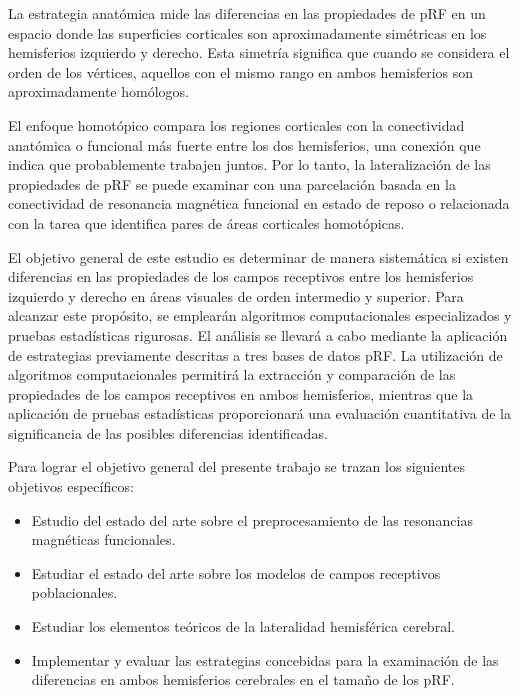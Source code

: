	La estrategia anatómica mide las diferencias en las propiedades de pRF en un espacio donde las superficies corticales son aproximadamente simétricas en los hemisferios izquierdo y derecho. Esta simetría significa que cuando se considera el orden de los vértices, aquellos con el mismo rango en ambos hemisferios son aproximadamente homólogos.
	
	El enfoque homotópico compara los regiones corticales con la conectividad anatómica o funcional más fuerte entre los dos hemisferios, una conexión que indica que probablemente trabajen juntos. Por lo tanto, la lateralización de las propiedades de pRF se puede examinar con una parcelación basada en la conectividad de resonancia magnética funcional en estado de reposo o relacionada con la tarea que identifica pares de áreas corticales homotópicas.  
	
	El objetivo general de este estudio es determinar de manera sistemática si existen diferencias en las propiedades de los campos receptivos entre los hemisferios izquierdo y derecho en áreas visuales de orden intermedio y superior. Para alcanzar este propósito, se emplearán algoritmos computacionales especializados y pruebas estadísticas rigurosas. El análisis se llevará a cabo mediante la aplicación de estrategias previamente descritas a tres bases de datos pRF. La utilización de algoritmos computacionales permitirá la extracción y comparación de las propiedades de los campos receptivos en ambos hemisferios, mientras que la aplicación de pruebas estadísticas proporcionará una evaluación cuantitativa de la significancia de las posibles diferencias identificadas.
	
	Para lograr el objetivo general del presente trabajo se
	trazan los siguientes objetivos específicos:
	
	\begin{itemize}
		\item Estudio del estado del arte sobre el preprocesamiento de las resonancias magn\'eticas funcionales.
		\item Estudiar el estado del arte sobre los modelos de campos receptivos poblacionales.
		\item Estudiar los elementos te\'oricos de la lateralidad hemisf\'erica cerebral.
		\item Implementar y evaluar las estrategias concebidas para la examinaci\'on de las diferencias en ambos hemisferios cerebrales en el tama\~no de los pRF.
		
	\end{itemize}
	
